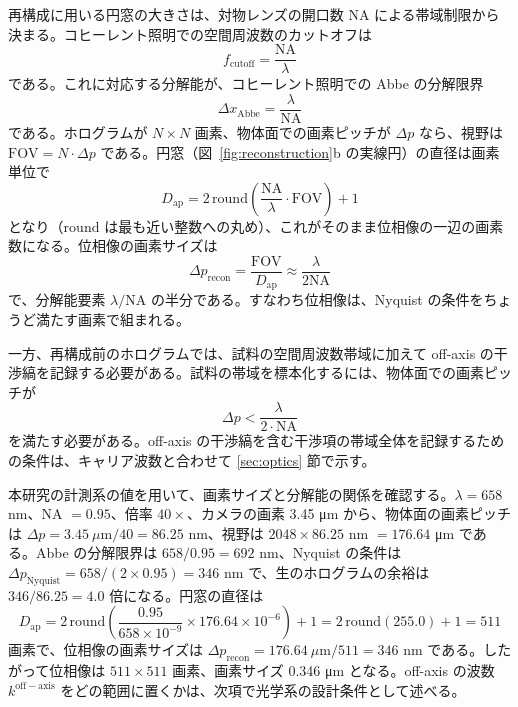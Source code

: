 再構成に用いる円窓の大きさは、対物レンズの開口数 NA による帯域制限から決まる。コヒーレント照明での空間周波数のカットオフは
\begin{equation}
f_{\mathrm{cutoff}} = \frac{\mathrm{NA}}{\lambda}
\end{equation}
である。これに対応する分解能が、コヒーレント照明での Abbe の分解限界
\begin{equation}
\label{eq:abbe}
\Delta x_{\mathrm{Abbe}} = \frac{\lambda}{\mathrm{NA}}
\end{equation}
である。ホログラムが $N \times N$ 画素、物体面での画素ピッチが $\Delta p$ なら、視野は $\mathrm{FOV} = N \cdot \Delta p$ である。円窓（図~\ref{fig:reconstruction}b の実線円）の直径は画素単位で
\begin{equation}
D_{\mathrm{ap}} = 2 \,\mathrm{round}\!\left( \frac{\mathrm{NA}}{\lambda} \cdot \mathrm{FOV} \right) + 1
\end{equation}
となり（$\mathrm{round}$ は最も近い整数への丸め）、これがそのまま位相像の一辺の画素数になる。位相像の画素サイズは
\begin{equation}
\Delta p_{\mathrm{recon}} = \frac{\mathrm{FOV}}{D_{\mathrm{ap}}} \approx \frac{\lambda}{2\mathrm{NA}}
\end{equation}
で、分解能要素 $\lambda/\mathrm{NA}$ の半分である。すなわち位相像は、Nyquist の条件をちょうど満たす画素で組まれる。

一方、再構成前のホログラムでは、試料の空間周波数帯域に加えて off-axis の干渉縞を記録する必要がある。試料の帯域を標本化するには、物体面での画素ピッチが
\begin{equation}
\Delta p < \frac{\lambda}{2 \cdot \mathrm{NA}}
\end{equation}
を満たす必要がある。off-axis の干渉縞を含む干渉項の帯域全体を記録するための条件は、キャリア波数と合わせて \ref{sec:optics} 節で示す。

本研究の計測系の値を用いて、画素サイズと分解能の関係を確認する。$\lambda = 658$ nm、NA $= 0.95$、倍率 $40\times$、カメラの画素 3.45 μm から、物体面の画素ピッチは $\Delta p = 3.45~\mu\mathrm{m}/40 = 86.25$ nm、視野は $2048 \times 86.25$ nm $= 176.64$ μm である。Abbe の分解限界は $658/0.95 = 692$ nm、Nyquist の条件は $\Delta p_{\mathrm{Nyquist}} = 658/(2 \times 0.95) = 346$ nm で、生のホログラムの余裕は $346/86.25 = 4.0$ 倍になる。円窓の直径は
\begin{equation}
D_{\mathrm{ap}} = 2 \,\mathrm{round}\!\left( \frac{0.95}{658 \times 10^{-9}} \times 176.64 \times 10^{-6} \right) + 1 = 2 \,\mathrm{round}(255.0) + 1 = 511
\end{equation}
画素で、位相像の画素サイズは $\Delta p_{\mathrm{recon}} = 176.64~\mu\mathrm{m}/511 = 346$ nm である。したがって位相像は $511 \times 511$ 画素、画素サイズ 0.346 μm となる。off-axis の波数 $k^{\mathrm{off-axis}}$ をどの範囲に置くかは、次項で光学系の設計条件として述べる。

